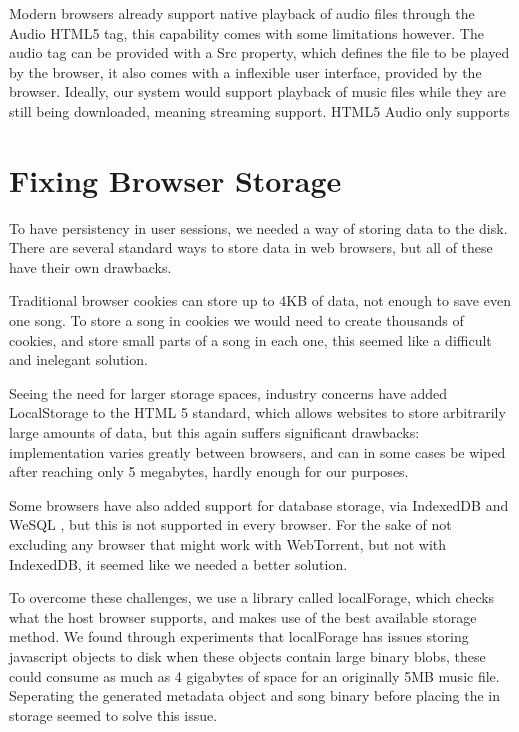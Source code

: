 

Modern browsers already support native playback of audio files through the Audio HTML5 tag, 
this capability comes with some limitations however.
The audio tag can be provided with a Src property, which defines the file to be played by the browser,
it also comes with a inflexible user interface, provided by the browser.
Ideally, our system would support playback of music files while they are still being downloaded, 
meaning streaming support. 
HTML5 Audio only supports 
\newline


\section{Fixing Browser Storage}
To have persistency in user sessions, we needed a way of storing data to the disk. There are several standard ways to store data in web browsers, but all of these have their own drawbacks.

Traditional browser cookies can store up to 4KB of data, 
not enough to save even one song. 
To store a song in cookies we would need to create thousands of cookies, 
and store small parts of a song in each one, 
this seemed like a difficult and inelegant solution.

Seeing the need for larger storage spaces, 
industry concerns have added LocalStorage to the HTML 5 standard,
which allows websites to store arbitrarily large amounts of data,
but this again suffers significant drawbacks: 
implementation varies greatly between browsers, 
and can in some cases be wiped after reaching only 5 megabytes, 
hardly enough for our purposes.

Some browsers have also added support for database storage, via IndexedDB and WeSQL \citep{WebSQL}, 
but this is not supported in every browser. 
For the sake of not excluding any browser that might work with WebTorrent, but not with IndexedDB,
it seemed like we needed a better solution.
\newline

To overcome these challenges, we use a library called localForage, 
which checks what the host browser supports,
and makes use of the best available storage method.
We found through experiments
that localForage has issues storing javascript objects to disk when these objects contain large binary blobs, 
these could consume as much as 4 gigabytes of space for an originally 5MB music file.
Seperating the generated metadata object and song binary before placing the in storage
seemed to solve this issue.
\newline

